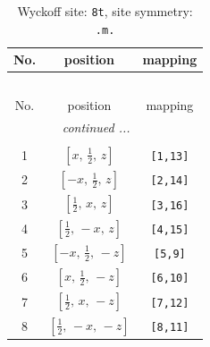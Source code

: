 \documentclass[fleqn,8pt]{jsarticle}
\begin{document}
\renewcommand{\arraystretch}{1.2}
\begin{longtable}{ccc}
\caption{Wyckoff site: {\tt 8t}, site symmetry: {\tt .m.}}
 \\
 \hline \hline
No. & position & mapping \\ \hline \endfirsthead

\multicolumn{2}{l}{\tablename\ \thetable{}} \\
 \hline \hline
No. & position & mapping \\ \hline \endhead

 \hline \hline
\multicolumn{2}{r}{\footnotesize\it continued ...} \\ \endfoot

 \hline \hline
\multicolumn{2}{r}{} \\ \endlastfoot

1 & $\left[ x,\, \frac{1}{2},\, z \right]$ & {\tt [1,13]} \\ \hline
2 & $\left[ - x,\, \frac{1}{2},\, z \right]$ & {\tt [2,14]} \\ \hline
3 & $\left[ \frac{1}{2},\, x,\, z \right]$ & {\tt [3,16]} \\ \hline
4 & $\left[ \frac{1}{2},\, - x,\, z \right]$ & {\tt [4,15]} \\ \hline
5 & $\left[ - x,\, \frac{1}{2},\, - z \right]$ & {\tt [5,9]} \\ \hline
6 & $\left[ x,\, \frac{1}{2},\, - z \right]$ & {\tt [6,10]} \\ \hline
7 & $\left[ \frac{1}{2},\, x,\, - z \right]$ & {\tt [7,12]} \\ \hline
8 & $\left[ \frac{1}{2},\, - x,\, - z \right]$ & {\tt [8,11]} \\
\end{longtable}
\renewcommand{\arraystretch}{1.2}
\end{document}
